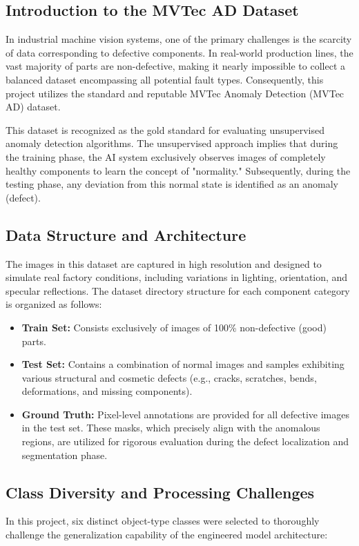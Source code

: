 \documentclass{article}
\begin{document}
\subsection*{Introduction to the MVTec AD Dataset}
In industrial machine vision systems, one of the primary challenges is the scarcity of data corresponding to defective components. In real-world production lines, the vast majority of parts are non-defective, making it nearly impossible to collect a balanced dataset encompassing all potential fault types. Consequently, this project utilizes the standard and reputable MVTec Anomaly Detection (MVTec AD) dataset.

This dataset is recognized as the gold standard for evaluating unsupervised anomaly detection algorithms. The unsupervised approach implies that during the training phase, the AI system exclusively observes images of completely healthy components to learn the concept of "normality." Subsequently, during the testing phase, any deviation from this normal state is identified as an anomaly (defect).

\subsection*{Data Structure and Architecture}
The images in this dataset are captured in high resolution and designed to simulate real factory conditions, including variations in lighting, orientation, and specular reflections. The dataset directory structure for each component category is organized as follows:

\begin{itemize}
	\item \textbf{Train Set:} Consists exclusively of images of 100\% non-defective (good) parts.
	\item \textbf{Test Set:} Contains a combination of normal images and samples exhibiting various structural and cosmetic defects (e.g., cracks, scratches, bends, deformations, and missing components).
	\item \textbf{Ground Truth:} Pixel-level annotations are provided for all defective images in the test set. These masks, which precisely align with the anomalous regions, are utilized for rigorous evaluation during the defect localization and segmentation phase.
\end{itemize}

\subsection*{Class Diversity and Processing Challenges}
In this project, six distinct object-type classes were selected to thoroughly challenge the generalization capability of the engineered model architecture:
\end{document}
